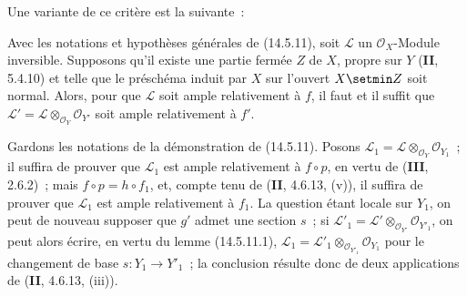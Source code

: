 Une variante de ce critère est la suivante~:

\begin{corollary}[14.5.12]
\label{IV.14.5.12-fr}
Avec les notations et hypothèses générales de \textup{(14.5.11)}, soit $\mathcal L$ un
$\mathcal O_X$-Module inversible. Supposons qu'il existe une partie fermée $Z$ de
$X$, propre sur $Y$ \textup{(\textbf{II}, 5.4.10)} et telle que le préschéma induit par $X$
sur l'ouvert $X\setmin Z$ soit normal. Alors, pour que $\mathcal L$ soit ample relativement
à $f$, il faut et il suffit que
$\mathcal L'=\mathcal L\otimes_{\mathcal O_Y}\mathcal O_{Y'}$ soit ample
relativement à $f'$.
\end{corollary}

Gardons les notations de la démonstration de (14.5.11). Posons
$\mathcal L_1=\mathcal L\otimes_{\mathcal O_Y}\mathcal O_{Y_1}$~; il suffira de
prouver que $\mathcal L_1$ est ample relativement à $f\circ p$, en vertu de
(\textbf{III}, 2.6.2)~; mais $f\circ p=h\circ f_1$, et, compte tenu de
(\textbf{II}, 4.6.13, (v)), il suffira de prouver que $\mathcal L_1$ est ample
relativement à $f_1$. La question étant locale sur $Y_1$, on peut de nouveau
supposer que $g'$ admet une section $s$~; si
$\mathcal L'_1=\mathcal L'\otimes_{\mathcal O_{Y'}}\mathcal O_{Y'_1}$, on peut
alors écrire, en vertu du lemme (14.5.11.1),
$\mathcal L_1=\mathcal L'_1\otimes_{\mathcal O_{Y'_1}}\mathcal O_{Y_1}$ pour le
changement de base $s:Y_1\to Y'_1$~; la conclusion résulte donc de deux
applications de (\textbf{II}, 4.6.13, (iii)).


